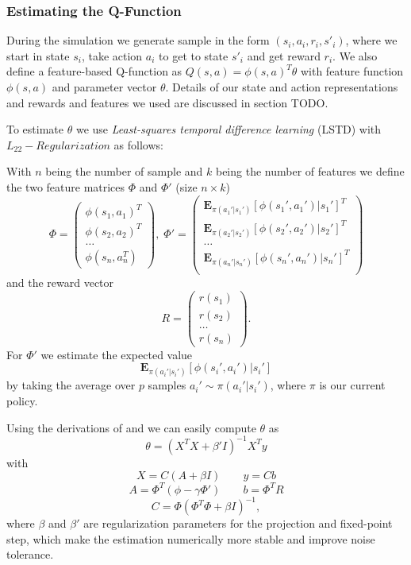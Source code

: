 \documentclass[twoside]{article}
\begin{document}
\subsubsection{Estimating the Q-Function}
During the simulation we generate sample in the form $(s_i, a_i, r_i, s'_i)$,
where we start in state $s_i$, take action $a_i$ to get to state $s'_i$ and
get reward $r_i$. We also define a feature-based Q-function as $Q(s, a) =
\phi(s,a)^T \theta$ with feature function $\phi(s,a)$ and parameter vector
$\theta$. Details of our state and action representations and rewards and
features we used are discussed in section TODO.

To estimate $\theta$ we use \emph{Least-squares temporal difference
learning} (LSTD) with $L_{22}-Regularization$\cite{lstdRegularization} as
follows:

With $n$ being the number of sample and $k$ being the number of features
we define the two feature matrices $\Phi$ and $\Phi'$ (size $n\times k$)
$$
\Phi = \left(
\begin{array}{c}
    \phi(s_1,a_1)^T \\
    \phi(s_2,a_2)^T \\
    \dots \\
    \phi(s_n,a_n^T)
\end{array} \right), \;
\Phi' = \left(
\begin{array}{c}
    \mathbf{E}_{\pi(a_1'|s_1')} [\phi(s_1', a_1') | s_1']^T \\
    \mathbf{E}_{\pi(a_2'|s_2')} [\phi(s_2', a_2') | s_2']^T \\
    \dots \\
    \mathbf{E}_{\pi(a_n'|s_n')} [\phi(s_n', a_n') | s_n']^T \\
\end{array} \right)
$$
and the reward vector
$$
R = \left(
\begin{array}{c}
    r(s_1) \\
    r(s_2) \\
    \dots \\
    r(s_n)
\end{array} \right).
$$
For $\Phi'$ we estimate the expected value
$$
\mathbf{E}_{\pi(a_i'|s_i')} [\phi(s_i', a_i') | s_i']
$$
by taking the average over $p$ samples $a_i' \sim \pi(a_i'|s_i')$, where $\pi$
is our current policy.

Using the derivations of \cite{lspi} and \cite{lstdRegularization} we can easily
compute $\theta$ as
$$
\theta = (X^TX+\beta'I)^{-1}X^Ty
$$
with
$$X = C(A+\beta I) \qquad y=Cb$$
$$A = \Phi^T(\phi-\gamma \Phi') \qquad b=\Phi^T R$$
$$C = \Phi(\Phi^T\Phi+\beta I)^{-1},$$
where $\beta$ and $\beta'$ are regularization parameters for the projection and
fixed-point step, which make the estimation numerically more stable and improve
noise tolerance.
\end{document}

